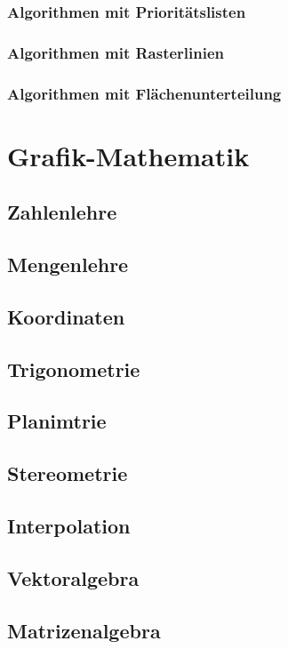 \documentclass{scrreprt}
\begin{document}
\subsection{Algorithmen mit Prioritätslisten}
\subsection{Algorithmen mit Rasterlinien}
\subsection{Algorithmen mit Flächenunterteilung}

\chapter{Grafik-Mathematik}
\section{Zahlenlehre}
\section{Mengenlehre}
\section{Koordinaten}
\section{Trigonometrie}
\section{Planimtrie}
\section{Stereometrie}
\section{Interpolation}
\section{Vektoralgebra}
\section{Matrizenalgebra}

\end{document}
